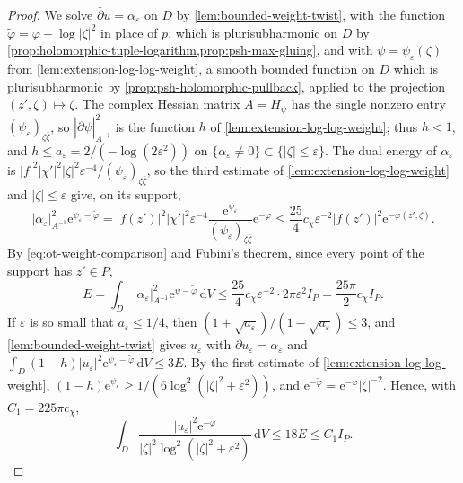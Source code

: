 \begin{proof}
We solve $\bar\partial u=\alpha_\varepsilon$ on $D$ by \cref{lem:bounded-weight-twist}, with the function $\widetilde\varphi=\varphi+\log|\zeta|^2$ in place of $p$, which is plurisubharmonic on $D$ by \cref{prop:holomorphic-tuple-logarithm,prop:psh-max-gluing}, and with $\psi=\psi_\varepsilon(\zeta)$ from \cref{lem:extension-log-log-weight}, a smooth bounded function on $D$ which is plurisubharmonic by \cref{prop:psh-holomorphic-pullback}, applied to the projection $(z',\zeta)\mapsto\zeta$. The complex Hessian matrix $A=H_\psi$ has the single nonzero entry $(\psi_\varepsilon)_{\zeta\bar\zeta}$, so $|\bar\partial\psi|_{A^{-1}}^2$ is the function $h$ of \cref{lem:extension-log-log-weight}; thus $h<1$, and $h\le a_\varepsilon=2/(-\log(2\varepsilon^2))$ on $\{\alpha_\varepsilon\ne0\}\subset\{|\zeta|\le\varepsilon\}$. The dual energy of $\alpha_\varepsilon$ is $|f|^2|\chi'|^2|\zeta|^2\varepsilon^{-4}/(\psi_\varepsilon)_{\zeta\bar\zeta}$, so the third estimate of \cref{lem:extension-log-log-weight} and $|\zeta|\le\varepsilon$ give, on its support,
\[
 |\alpha_\varepsilon|_{A^{-1}}^2\mathrm e^{\psi_\varepsilon-\widetilde\varphi}
 =|f(z')|^2|\chi'|^2\varepsilon^{-4}\frac{\mathrm e^{\psi_\varepsilon}}{(\psi_\varepsilon)_{\zeta\bar\zeta}}\mathrm e^{-\varphi}
 \le\frac{25}4c_\chi\varepsilon^{-2}|f(z')|^2\mathrm e^{-\varphi(z',\zeta)}.
\]
By \eqref{eq:ot-weight-comparison} and Fubini's theorem, since every point of the support has $z'\in P$,
\[
 E=\int_D|\alpha_\varepsilon|_{A^{-1}}^2\mathrm e^{\psi-\widetilde\varphi}\,\mathrm dV
 \le\frac{25}4c_\chi\varepsilon^{-2}\cdot2\pi\varepsilon^2I_P=\frac{25\pi}2c_\chi I_P.
\]
If $\varepsilon$ is so small that $a_\varepsilon\le1/4$, then $(1+\sqrt{a_\varepsilon})/(1-\sqrt{a_\varepsilon})\le3$, and \cref{lem:bounded-weight-twist} gives $u_\varepsilon$ with $\bar\partial u_\varepsilon=\alpha_\varepsilon$ and $\int_D(1-h)|u_\varepsilon|^2\mathrm e^{\psi_\varepsilon-\widetilde\varphi}\,\mathrm dV\le3E$. By the first estimate of \cref{lem:extension-log-log-weight}, $(1-h)\mathrm e^{\psi_\varepsilon}\ge1/(6\log^2(|\zeta|^2+\varepsilon^2))$, and $\mathrm e^{-\widetilde\varphi}=\mathrm e^{-\varphi}|\zeta|^{-2}$. Hence, with $C_1=225\pi c_\chi$,
\begin{equation}\label{eq:normal-extension-correction}
 \int_D\frac{|u_\varepsilon|^2\mathrm e^{-\varphi}}
 { |\zeta|^2\log^2(|\zeta|^2+\varepsilon^2)}\,\mathrm dV
       \le18E\le C_1I_P.
\end{equation}


\end{proof}
